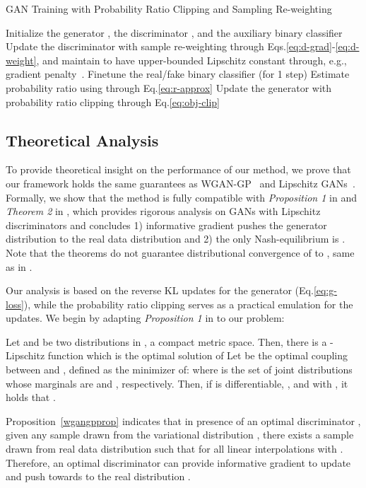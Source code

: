 \documentclass{article}
\newcommand{\0}{\bm{0}}
\begin{document}
\begin{algorithm}[!h]
\centering
\caption{\small GAN Training with Probability Ratio Clipping and Sampling Re-weighting}
\label{alg:opt}
\begin{algorithmic}[1]
\STATE Initialize the generator , the discriminator , and the auxiliary binary classifier 
	    \STATE Update the discriminator  with sample re-weighting through Eqs.\eqref{eq:d-grad}-\eqref{eq:d-weight}, and maintain  to have upper-bounded Lipschitz constant through, e.g., gradient penalty~\cite{wgangp}.
	\ENDFOR
	    \STATE Finetune the real/fake binary classifier  (for 1 step)
	    \STATE Estimate probability ratio  using  through Eq.\eqref{eq:r-approx}
	    \STATE Update the generator  with probability ratio clipping through Eq.\eqref{eq:obj-clip}
    \ENDFOR
\ENDFOR
\end{algorithmic}
\end{algorithm}

\subsection{Theoretical Analysis}\label{sec:theory}
To provide theoretical insight on the performance of our method, we prove that our framework holds the same guarantees as WGAN-GP~\citep{wgangp} and Lipschitz GANs~\citep{lipschitz}. Formally, we show that the method is fully compatible with \emph{Proposition 1} in \citep{wgangp} and \emph{Theorem 2} in \citep{lipschitz}, which provides rigorous analysis on GANs with Lipschitz discriminators and concludes 1) informative gradient pushes the generator distribution to the real data distribution and 2) the only Nash-equilibrium is . Note that the theorems do not guarantee distributional convergence of  to , same as in \citep{wgangp,lipschitz}.







Our analysis is based on the reverse KL updates for the generator (Eq.\ref{eq:g-loss}), while the probability ratio clipping serves as a practical emulation for the updates. We begin by adapting \emph{Proposition 1} in \citet{wgangp} to our problem: 
\begin{prop} Let  and  be two distributions in , a compact metric space. Then, there is a -Lipschitz function  which is the optimal solution of 
Let  be the optimal coupling between  and , defined as the minimizer of:  where  is the set of joint distributions  whose marginals are  and , respectively. Then, if  is differentiable, , and  with , it holds that 
. \label{wgangpprop}
\end{prop}
Proposition~\ref{wgangpprop} indicates that in presence of an optimal discriminator , given any sample  drawn from the variational distribution , there exists a sample  drawn from real data distribution  such that  for all linear interpolations   with . Therefore, an optimal discriminator  can provide informative gradient to update  and push  towards to the real distribution . 
\end{document}
